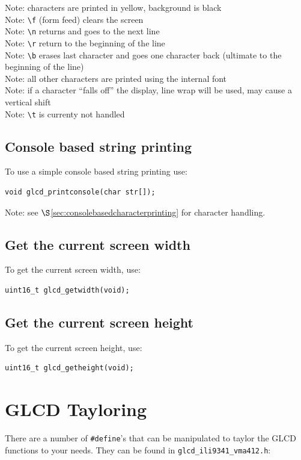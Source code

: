 \documentclass[12pt]{article}
\begin{document}
Note: characters are printed in yellow, background is black\\
Note: \lstinline|\f| (form feed) clears the screen\\
Note: \lstinline|\n| returns and goes to the next line\\
Note: \lstinline|\r| return to the beginning of the line\\
Note: \lstinline|\b| erases last character and goes one character back (ultimate to the beginning of the line)\\
Note: all other characters are printed using the internal font\\
Note: if a character ``falls off'' the display, line wrap will be used, may cause a vertical shift\\
Note: \lstinline|\t| is currenty not handled
\subsection{Console based string printing}
To use a simple console based string printing use:
\begin{lstlisting}
void glcd_printconsole(char str[]);
\end{lstlisting}

Note: see $\S$\ref{sec:consolebasedcharacterprinting} for character handling.

\subsection{Get the current screen width}
To get the current screen width, use:

\begin{lstlisting}
uint16_t glcd_getwidth(void);
\end{lstlisting}

\subsection{Get the current screen height}
To get the current screen height, use:
\begin{lstlisting}
uint16_t glcd_getheight(void);
\end{lstlisting}




\section{GLCD Tayloring}
There are a number of \lstinline|#define|'s that can be manipulated to taylor the GLCD functions to your needs. They can be found in \lstinline|glcd_ili9341_vma412.h|:
\end{document}
